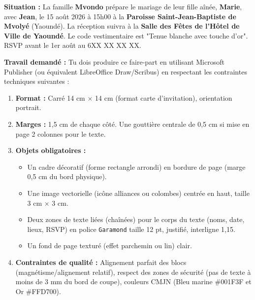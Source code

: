 \documentclass[11pt]{article}
\begin{document}
\begin{exercice}
\textbf{Situation :} La famille \textbf{Mvondo} prépare le mariage de leur fille aînée, \textbf{Marie}, avec \textbf{Jean}, le 15 août 2026 à 15h00 à la \textbf{Paroisse Saint-Jean-Baptiste de Mvolyé} (Yaoundé). La réception suivra à la \textbf{Salle des Fêtes de l'Hôtel de Ville de Yaoundé}. Le code vestimentaire est "Tenue blanche avec touche d'or". RSVP avant le 1er août au 6XX XX XX XX.

\textbf{Travail demandé :} Tu dois produire ce faire-part en utilisant Microsoft Publisher (ou équivalent LibreOffice Draw/Scribus) en respectant les contraintes techniques suivantes :
\begin{enumerate}
    \item \textbf{Format :} Carré 14 cm $\times$ 14 cm (format carte d'invitation), orientation portrait.
    \item \textbf{Marges :} 1,5 cm de chaque côté. Une gouttière centrale de 0,5 cm si mise en page 2 colonnes pour le texte.
    \item \textbf{Objets obligatoires :}
        \begin{itemize}
            \item Un cadre décoratif (forme rectangle arrondi) en bordure de page (marge 0,5 cm du bord physique).
            \item Une image vectorielle (icône alliances ou colombes) centrée en haut, taille 3 cm $\times$ 3 cm.
            \item Deux zones de texte liées (chaînées) pour le corps du texte (noms, date, lieux, RSVP) en police \texttt{Garamond} taille 12 pt, justifié, interligne 1,15.
            \item Un fond de page texturé (effet parchemin ou lin) clair.
        \end{itemize}
    \item \textbf{Contraintes de qualité :} Alignement parfait des blocs (magnétisme/alignement relatif), respect des zones de sécurité (pas de texte à moins de 3 mm du bord de coupe), couleurs CMJN (Bleu marine \#001F3F et Or \#FFD700).
\end{enumerate}


\end{exercice}
\end{document}
